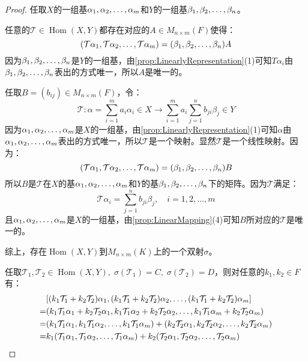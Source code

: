 \begin{proof}
	任取$X$的一组基$\alpha_1, \alpha_2, \dots, \alpha_{m}$和$Y$的一组基$\beta_1, \beta_2, \dots, \beta_{n}$。\par
	任意的$\mathcal{T}\in\operatorname{Hom}(X,Y)$都存在对应的$A\in M_{n\times m}(F)$使得：
	\begin{equation*}
		(\mathcal{T}\alpha_1, \mathcal{T}\alpha_2, \dots, \mathcal{T}\alpha_{m})=(\beta_1, \beta_2, \dots, \beta_{n})A
	\end{equation*}
	因为$\beta_1, \beta_2, \dots, \beta_{n}$是$Y$的一组基，由\cref{prop:LinearlyRepresentation}(1)可知$T\alpha_i$由$\beta_1, \beta_2, \dots, \beta_{n}$表出的方式唯一，所以$A$是唯一的。\par
	任取$B=(b_{ij})\in M_{n\times m}(F)$，令：
	\begin{equation*}
		\mathcal{T}:\alpha=\sum_{i=1}^{m}a_i\alpha_i\in X\longrightarrow\sum_{i=1}^{m}a_i\sum_{j=1}^{n}b_{ji}\beta_j\in Y
	\end{equation*}
	因为$\alpha_1, \alpha_2, \dots, \alpha_{m}$是$X$的一组基，由\cref{prop:LinearlyRepresentation}(1)可知$\alpha$由$\alpha_1, \alpha_2, \dots, \alpha_{m}$表出的方式唯一，所以$\mathcal{T}$是一个映射。显然$\mathcal{T}$是一个线性映射。因为：
	\begin{equation*}
		(\mathcal{T}\alpha_1, \mathcal{T}\alpha_2, \dots, \mathcal{T}\alpha_{m})=(\beta_1, \beta_2, \dots, \beta_{n})B
	\end{equation*}
	所以$B$是$\mathcal{T}$在$X$的基$\alpha_1, \alpha_2, \dots, \alpha_{m}$和$Y$的基$\beta_1, \beta_2, \dots, \beta_{n}$下的矩阵。因为$\mathcal{T}$满足：
	\begin{equation*}
		\mathcal{T}\alpha_i=\sum_{j=1}^{n}b_{ji}\beta_j,\quad i=1,2,\dots,m
	\end{equation*}
	且$\alpha_1, \alpha_2, \dots, \alpha_{m}$是$X$的一组基，由\cref{prop:LinearMapping}(4)可知$B$所对应的$\mathcal{T}$是唯一的。\par
	综上，存在$\operatorname{Hom}(X,Y)$到$M_{n\times m}(K)$上的一个双射$\sigma$。\par
	任取$\mathcal{T}_1,\mathcal{T}_2\in\operatorname{Hom}(X,Y),\;\sigma(\mathcal{T}_1)=C,\;\sigma(\mathcal{T}_2)=D$，则对任意的$k_1,k_2\in F$有：
	\begin{align*}
		&[\seq{(k_1\mathcal{T}_1+k_2\mathcal{T}_2)\alpha}{m}] \\
		=&(k_1\mathcal{T}_1\alpha_1+k_2\mathcal{T}_2\alpha_1,k_1\mathcal{T}_1\alpha_2+k_2\mathcal{T}_2\alpha_2,\dots,k_1\mathcal{T}_1\alpha_m+k_2\mathcal{T}_2\alpha_m) \\
		=&(k_1\mathcal{T}_1\alpha_1,k_1\mathcal{T}_1\alpha_2,\dots,k_1\mathcal{T}_1\alpha_m)+(k_2\mathcal{T}_2\alpha_1,k_2\mathcal{T}_2\alpha_2,\dots,k_2\mathcal{T}_2\alpha_m) \\
		=&k_1(\mathcal{T}_1\alpha_1,\mathcal{T}_1\alpha_2,\dots,\mathcal{T}_1\alpha_m)+k_2(\mathcal{T}_2\alpha_1,\mathcal{T}_2\alpha_2,\dots,\mathcal{T}_2\alpha_m) \\

\end{align*}
\end{proof}
